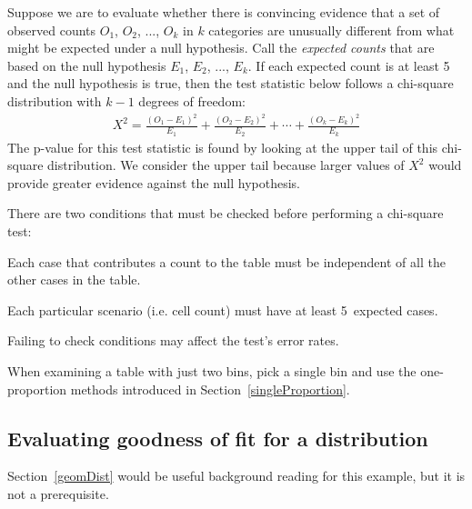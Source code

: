 \begin{termBox}{
Suppose we are to evaluate whether there is convincing evidence that a set of observed counts $O_1$, $O_2$, ..., $O_k$ in $k$ categories are unusually different from what might be expected under a null hypothesis. Call the \emph{expected counts} that are based on the null hypothesis $E_1$, $E_2$, ..., $E_k$. If each expected count is at least 5 and the null hypothesis is true, then the test statistic below follows a chi-square distribution with $k-1$ degrees of freedom:
\begin{align*}
X^2 = \frac{(O_1 - E_1)^2}{E_1} + \frac{(O_2 - E_2)^2}{E_2} + \cdots + \frac{(O_k - E_k)^2}{E_k}
\end{align*}
The p-value for this test statistic is found by looking at the upper tail of this chi-square distribution. We consider the upper tail because larger values of $X^2$ would provide greater evidence against the null hypothesis.}
\end{termBox}

\begin{tipBox}{
There are two conditions that must be checked before performing a chi-square test:\vspace{-1mm}
\begin{description}
\setlength{\itemsep}{0mm}
\item[Independence.] Each case that contributes a count to the table must be independent of all the other cases in the table.
\item[Sample size / distribution.] Each particular scenario (i.e. cell count) must have at least 5~expected cases.
\vspace{-1mm}
\end{description}
Failing to check conditions may affect the test's error rates.}
\end{tipBox}

When examining a table with just two bins, pick a single bin and use the one-proportion methods introduced in Section~\ref{singleProportion}.


\subsection{Evaluating goodness of fit for a distribution}

Section~\ref{geomDist} would be useful background reading for this example, but it is not a prerequisite.

